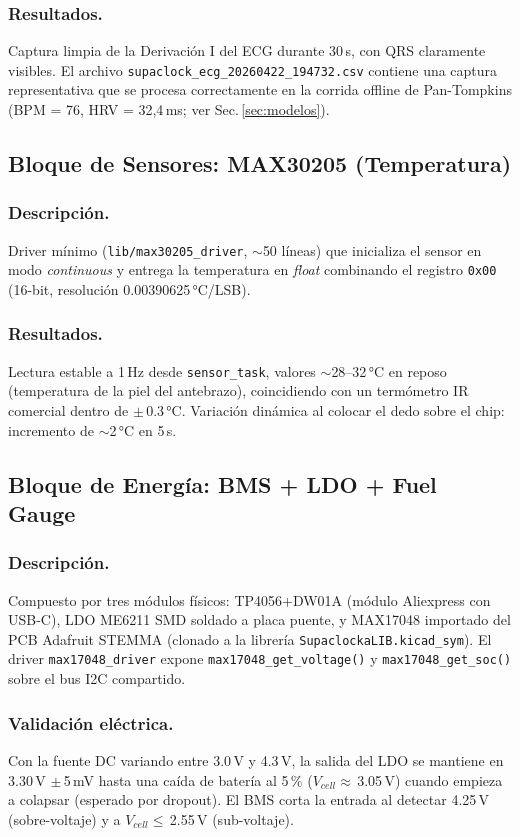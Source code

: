 \documentclass[letterpaper,11pt]{article}
\begin{document}
\subsubsection{Resultados.} Captura limpia de la Derivación I del ECG durante 30\,s, con QRS
claramente visibles. El archivo \texttt{supaclock\_ecg\_20260422\_194732.csv} contiene una
captura representativa que se procesa correctamente en la corrida offline de Pan-Tompkins
(BPM = 76, HRV = 32,4\,ms; ver Sec.\,\ref{sec:modelos}).

\subsection{Bloque de Sensores: MAX30205 (Temperatura)}
\subsubsection{Descripción.} Driver mínimo (\texttt{lib/max30205\_driver}, $\sim$50 líneas) que
inicializa el sensor en modo \textit{continuous} y entrega la temperatura en \textit{float}
combinando el registro \texttt{0x00} (16-bit, resolución 0.00390625\,°C/LSB).

\subsubsection{Resultados.} Lectura estable a 1\,Hz desde \texttt{sensor\_task}, valores
$\sim$28--32\,°C en reposo (temperatura de la piel del antebrazo), coincidiendo con un
termómetro IR comercial dentro de $\pm$\,0.3\,°C. Variación dinámica al colocar el dedo
sobre el chip: incremento de $\sim$2\,°C en 5\,s.

\subsection{Bloque de Energía: BMS + LDO + Fuel Gauge}
\subsubsection{Descripción.} Compuesto por tres módulos físicos: TP4056+DW01A (módulo Aliexpress
con USB-C), LDO ME6211 SMD soldado a placa puente, y MAX17048 importado del PCB Adafruit
STEMMA (clonado a la librería \texttt{SupaclockaLIB.kicad\_sym}). El driver
\texttt{max17048\_driver} expone \texttt{max17048\_get\_voltage()} y \texttt{max17048\_get\_soc()}
sobre el bus I2C compartido.

\subsubsection{Validación eléctrica.} Con la fuente DC variando entre 3.0\,V y 4.3\,V, la salida del
LDO se mantiene en 3.30\,V $\pm$\,5\,mV hasta una caída de batería al 5\,\%
($V_{cell}\approx$\,3.05\,V) cuando empieza a colapsar (esperado por dropout). El BMS corta
la entrada al detectar 4.25\,V (sobre-voltaje) y a $V_{cell}\leq$\,2.55\,V (sub-voltaje).
\end{document}
